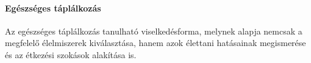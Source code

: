 \vspace*{-1ex}
\hypertarget{egeszseges-taplalkozas}{%
\paragraph{Egészséges táplálkozás}\label{egeszseges-taplalkozas}}

Az egészséges táplálkozás tanulható viselkedésforma, melynek alapja
nemcsak a megfelelő élelmiszerek kiválasztása, hanem azok élettani
hatásainak megismerése és az étkezési szokások alakítása is.
